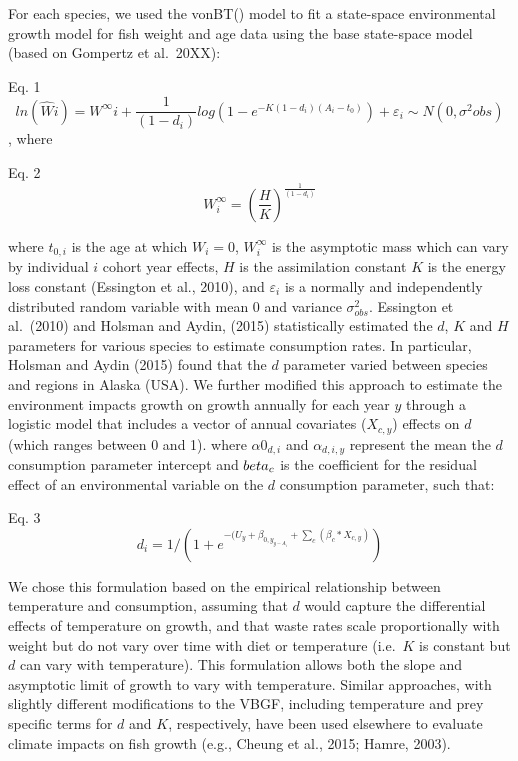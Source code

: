 \documentclass[
]{article}
\begin{document}
For each species, we used the vonBT() model to fit a state-space
environmental growth model for fish weight and age data using the base
state-space model (based on Gompertz et al.~20XX):

Eq. 1
\[ ln(\hat{W}{i}) = W^\infty{i} + \frac{1}{(1-d_{i})}log(1-e^{-K(1-d_{i})(A_i-t_0)})+\varepsilon_i\sim N(0,\sigma^2{obs})\]
, where

Eq. 2 \[W^\infty_{i} =(\frac{H}{K})^{\frac{1}{(1 - d_{i})}} \]

where \(t_{0,i}\) is the age at which \(W_{i} = 0\), \(W^{\infty}_{i}\)
is the asymptotic mass which can vary by individual \(i\) cohort year
effects, \(H\) is the assimilation constant \(K\) is the energy loss
constant (Essington et al., 2010), and \(\varepsilon_i\) is a normally
and independently distributed random variable with mean 0 and variance
\(\sigma_{obs}^2\). Essington et al.~(2010) and Holsman and Aydin,
(2015) statistically estimated the \(d\), \(K\) and \(H\) parameters for
various species to estimate consumption rates. In particular, Holsman
and Aydin (2015) found that the \(d\) parameter varied between species
and regions in Alaska (USA). We further modified this approach to
estimate the environment impacts growth on growth annually for each year
\(y\) through a logistic model that includes a vector of annual
covariates (\(X_{c,y}\)) effects on \(d\) (which ranges between 0 and
1). where \(\alpha0_{d,i}\) and \(\alpha_{d,i,y}\) represent the mean
the \(d\) consumption parameter intercept and \(\\beta_{c}\) is the
coefficient for the residual effect of an environmental variable on the
\(d\) consumption parameter, such that:

Eq. 3
\[d_{i} = 1/(1+e^{-(U_{y}+\beta_{0,y_{y-A_i}}+\sum_c(\beta_{c}*X_{c,y})}) \]

We chose this formulation based on the empirical relationship between
temperature and consumption, assuming that \(d\) would capture the
differential effects of temperature on growth, and that waste rates
scale proportionally with weight but do not vary over time with diet or
temperature (i.e.~\(K\) is constant but \(d\) can vary with
temperature). This formulation allows both the slope and asymptotic
limit of growth to vary with temperature. Similar approaches, with
slightly different modifications to the VBGF, including temperature and
prey specific terms for \(d\) and \(K\), respectively, have been used
elsewhere to evaluate climate impacts on fish growth (e.g., Cheung et
al., 2015; Hamre, 2003).
\end{document}
